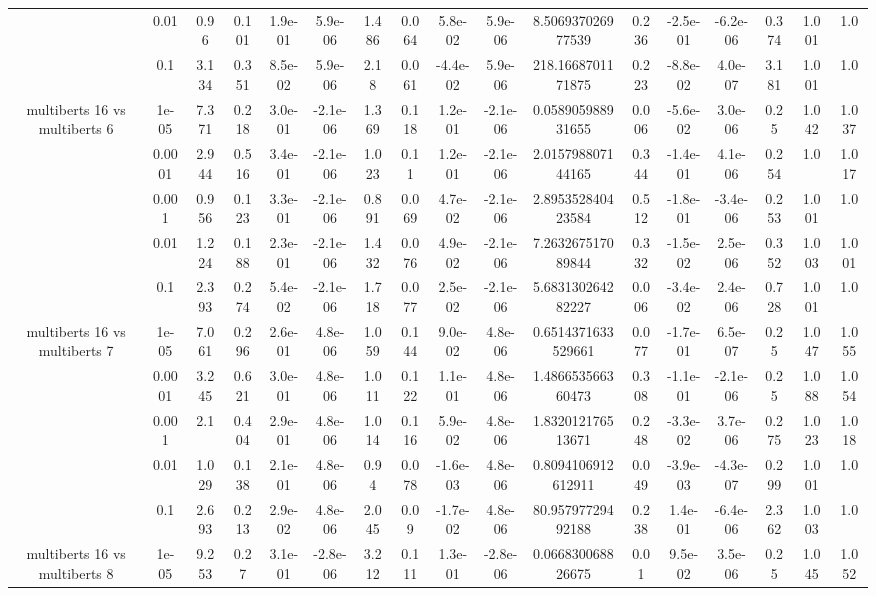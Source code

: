 \begin{tabular}{|c|c|c|c|c|c|c|c|c|c|c|c|c|c|c|c|c|}
 & 0.01 & 0.96 & 0.101 & 1.9e-01 & 5.9e-06 & 1.486 & 0.064 & 5.8e-02 & 5.9e-06 & 8.506937026977539 & 0.236 & -2.5e-01 & -6.2e-06 & 0.374 & 1.001 & 1.0 \\
 & 0.1 & 3.134 & 0.351 & 8.5e-02 & 5.9e-06 & 2.18 & 0.061 & -4.4e-02 & 5.9e-06 & 218.1668701171875 & 0.223 & -8.8e-02 & 4.0e-07 & 3.181 & 1.001 & 1.0 \\
\hline
\multirow{5}{*}{multiberts 16 vs multiberts 6} & 1e-05 & 7.371 & 0.218 & 3.0e-01 & -2.1e-06 & 1.369 & 0.118 & 1.2e-01 & -2.1e-06 & 0.058905988931655 & 0.006 & -5.6e-02 & 3.0e-06 & 0.25 & 1.042 & 1.037 \\
 & 0.0001 & 2.944 & 0.516 & 3.4e-01 & -2.1e-06 & 1.023 & 0.11 & 1.2e-01 & -2.1e-06 & 2.015798807144165 & 0.344 & -1.4e-01 & 4.1e-06 & 0.254 & 1.0 & 1.017 \\
 & 0.001 & 0.956 & 0.123 & 3.3e-01 & -2.1e-06 & 0.891 & 0.069 & 4.7e-02 & -2.1e-06 & 2.895352840423584 & 0.512 & -1.8e-01 & -3.4e-06 & 0.253 & 1.001 & 1.0 \\
 & 0.01 & 1.224 & 0.188 & 2.3e-01 & -2.1e-06 & 1.432 & 0.076 & 4.9e-02 & -2.1e-06 & 7.263267517089844 & 0.332 & -1.5e-02 & 2.5e-06 & 0.352 & 1.003 & 1.001 \\
 & 0.1 & 2.393 & 0.274 & 5.4e-02 & -2.1e-06 & 1.718 & 0.077 & 2.5e-02 & -2.1e-06 & 5.683130264282227 & 0.006 & -3.4e-02 & 2.4e-06 & 0.728 & 1.001 & 1.0 \\
\hline
\multirow{5}{*}{multiberts 16 vs multiberts 7} & 1e-05 & 7.061 & 0.296 & 2.6e-01 & 4.8e-06 & 1.059 & 0.144 & 9.0e-02 & 4.8e-06 & 0.6514371633529661 & 0.077 & -1.7e-01 & 6.5e-07 & 0.25 & 1.047 & 1.055 \\
 & 0.0001 & 3.245 & 0.621 & 3.0e-01 & 4.8e-06 & 1.011 & 0.122 & 1.1e-01 & 4.8e-06 & 1.486653566360473 & 0.308 & -1.1e-01 & -2.1e-06 & 0.25 & 1.088 & 1.054 \\
 & 0.001 & 2.1 & 0.404 & 2.9e-01 & 4.8e-06 & 1.014 & 0.116 & 5.9e-02 & 4.8e-06 & 1.832012176513671 & 0.248 & -3.3e-02 & 3.7e-06 & 0.275 & 1.023 & 1.018 \\
 & 0.01 & 1.029 & 0.138 & 2.1e-01 & 4.8e-06 & 0.94 & 0.078 & -1.6e-03 & 4.8e-06 & 0.8094106912612911 & 0.049 & -3.9e-03 & -4.3e-07 & 0.299 & 1.001 & 1.0 \\
 & 0.1 & 2.693 & 0.213 & 2.9e-02 & 4.8e-06 & 2.045 & 0.09 & -1.7e-02 & 4.8e-06 & 80.95797729492188 & 0.238 & 1.4e-01 & -6.4e-06 & 2.362 & 1.003 & 1.0 \\
\hline
\multirow{5}{*}{multiberts 16 vs multiberts 8} & 1e-05 & 9.253 & 0.27 & 3.1e-01 & -2.8e-06 & 3.212 & 0.111 & 1.3e-01 & -2.8e-06 & 0.066830068826675 & 0.01 & 9.5e-02 & 3.5e-06 & 0.25 & 1.045 & 1.052 \\

\end{tabular}
